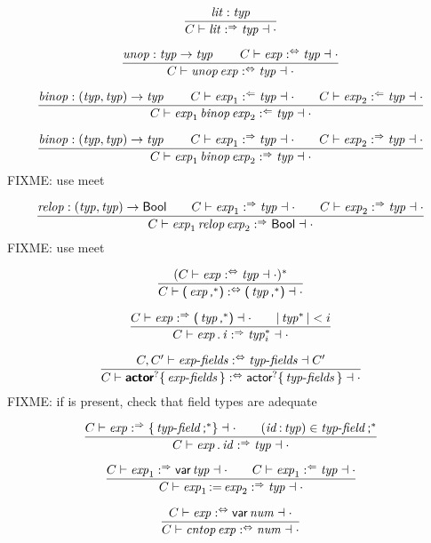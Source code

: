 $$
\frac{
  \x{lit} : \x{typ}
}{
  C \vdash \x{lit} \synth \x{typ} \dashv \cdot
}
$$

$$
\frac{
  \x{unop} : \x{typ} \Kto \x{typ}
  \qquad
  C \vdash \x{exp} \analsynth \x{typ} \dashv \cdot
}{
  C \vdash \x{unop} \x{exp} \analsynth \x{typ} \dashv \cdot
}
$$

$$
\frac{
  \x{binop} : (\x{typ}, \x{typ}) \Kto \x{typ}
  \qquad
  C \vdash \x{exp}_1 \anal \x{typ} \dashv \cdot
  \qquad
  C \vdash \x{exp}_2 \anal \x{typ} \dashv \cdot
}{
  C \vdash \x{exp}_1 \x{binop} \x{exp}_2 \anal \x{typ} \dashv \cdot
}
$$

$$
\frac{
  \x{binop} : (\x{typ}, \x{typ}) \Kto \x{typ}
  \qquad
  C \vdash \x{exp}_1 \synth \x{typ} \dashv \cdot
  \qquad
  C \vdash \x{exp}_2 \synth \x{typ} \dashv \cdot
}{
  C \vdash \x{exp}_1 \x{binop} \x{exp}_2 \synth \x{typ} \dashv \cdot
}
$$
FIXME: use meet

$$
\frac{
  \x{relop} : (\x{typ}, \x{typ}) \Kto \K{Bool}
  \qquad
  C \vdash \x{exp}_1 \synth \x{typ} \dashv \cdot
  \qquad
  C \vdash \x{exp}_2 \synth \x{typ} \dashv \cdot
}{
  C \vdash \x{exp}_1 \x{relop} \x{exp}_2 \synth \K{Bool} \dashv \cdot
}
$$
FIXME: use meet

$$
\frac{
  (C \vdash \x{exp} \analsynth \x{typ} \dashv \cdot)^\ast
}{
  C \vdash \K( \x{exp}\K,^\ast \K) \analsynth \K( \x{typ}\K,^\ast \K) \dashv \cdot
}
$$

$$
\frac{
  C \vdash \x{exp} \synth \K( \x{typ}\K,^\ast \K) \dashv \cdot
  \qquad
  |\x{typ}^\ast| < i
}{
  C \vdash \x{exp} \K. \x{i} \synth \x{typ}^\ast_i \dashv \cdot
}
$$

$$
\frac{
  C, C' \vdash \x{exp-fields} \analsynth \x{typ-fields} \dashv C'
}{
  C \vdash \KK{actor}^? \K\{ \x{exp-fields} \K\} \analsynth \K{actor}^? \K\{ \x{typ-fields} \K\} \dashv \cdot
}
$$
FIXME: if  is present, check that field types are adequate

$$
\frac{
  C \vdash \x{exp} \synth \K\{ \x{typ-field}\K;^\ast \K\} \dashv \cdot
  \qquad
  (\x{id} \K: \x{typ}) \in \x{typ-field}\K;^\ast
}{
  C \vdash \x{exp} \K. \x{id} \synth \x{typ} \dashv \cdot
}
$$

$$
\frac{
  C \vdash \x{exp}_1 \synth \K{var} \x{typ} \dashv \cdot
  \qquad
  C \vdash \x{exp}_1 \anal \x{typ} \dashv \cdot
}{
  C \vdash \x{exp}_1 \K{:=} \x{exp}_2 \synth \x{typ} \dashv \cdot
}
$$

$$
\frac{
  C \vdash \x{exp} \analsynth \K{var} \x{num} \dashv \cdot
}{
  C \vdash \x{cntop} \x{exp} \analsynth \x{num} \dashv \cdot
}
$$

